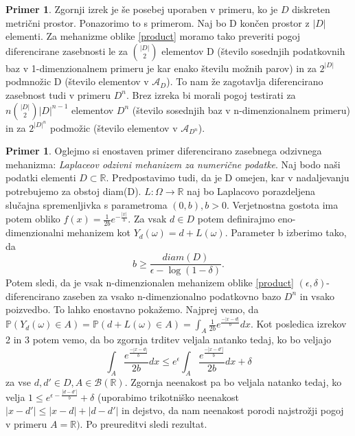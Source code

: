 \documentclass[12pt,a4paper]{amsart}
\theoremstyle{definition} %
\newtheorem{primer}[definicija]{Primer}
\theoremstyle{plain} %
\begin{document}
\newline
\newline
\begin{primer} Zgornji izrek je še posebej uporaben v primeru, ko je $D$ diskreten metrični prostor. Ponazorimo to s primerom. Naj bo D končen prostor z $|D|$ elementi. Za mehanizme oblike \eqref{product} moramo tako preveriti pogoj diferencirane zasebnosti le za $\binom{|D|}{2}$ elementov D (število sosednjih podatkovnih baz v 1-dimenzionalnem primeru je kar enako številu možnih parov) in za $2^{|D|}$ podmnožic D (število elementov v $\mathcal{A}_D$). To nam že zagotavlja diferencirano zasebnost tudi v primeru $D^n$.  Brez izreka bi morali pogoj testirati za $n\binom{|D|}{2}|D|^{n-1}$ elementov $D^n$ (število sosednjih baz v n-dimenzionalnem primeru) in za $2^{|D|^n}$ podmožic (število elementov v $\mathcal{A}_{D^n}$).
\end{primer}
\begin{primer}  Oglejmo si enostaven primer diferencirano zasebnega odzivnega mehanizma: \textit{Laplaceov odzivni mehanizem za numerične podatke}. Naj bodo naši podatki elementi $D \subset \mathbb{R}$. Predpostavimo tudi, da je D omejen, kar v nadaljevanju potrebujemo za obstoj diam(D). $L: \Omega \rightarrow \mathbb{R}$ naj bo Laplacovo porazdeljena slučajna spremenljivka s parametroma $(0,b), b > 0$.  
Verjetnostna gostota ima potem obliko $f(x)=\frac{1}{2b}e^{-\frac{|x|}{b}}$.  Za vsak $d \in D$ potem definirajmo eno-dimenzionalni mehanizem kot  $Y_{d}(\omega) = d + L(\omega)$. Parameter b izberimo tako, da 
$$b\geq \frac{diam(D)}{\epsilon - \log(1-\delta)}.$$
Potem sledi, da je vsak n-dimenzionalen mehanizem oblike \eqref{product} $(\epsilon, \delta)$-diferencirano zaseben za vsako n-dimenzionalno podatkovno bazo $D^n$ in vsako poizvedbo. To lahko enostavno pokažemo. 
\newline
\newline
Najprej vemo, da $\mathbb{P}(Y_{d}(\omega) \in A) = \mathbb{P}(d + L(\omega) \in A) = \int_{A}\frac{1}{2b}e^{\frac{-|x-d|}{b}}dx$. Kot posledica izrekov 2 in 3 potem vemo, da bo zgornja trditev veljala natanko tedaj, ko bo veljajo 
$$\int_{A}\frac{e^{\frac{-|x-d|}{b}}}{2b}dx \leq e^{\epsilon}\int_{A}\frac{e^{\frac{-|x-d'|}{b}}}{2b}dx + \delta$$
za vse $d,d' \in D, A \in \mathcal{B}(\mathbb{R})$. Zgornja neenakost pa bo veljala natanko tedaj, ko velja $1 \leq e^{\epsilon - \frac{|d-d'|}{b}} + \delta$ (uporabimo trikotniško neenakost $|x-d'| \leq |x-d| + |d -d'|$ in dejstvo, da nam neenakost porodi najstrožji pogoj v primeru $A=\mathbb{R})$. Po preureditvi sledi rezultat. 
\end{primer}
\end{document}
